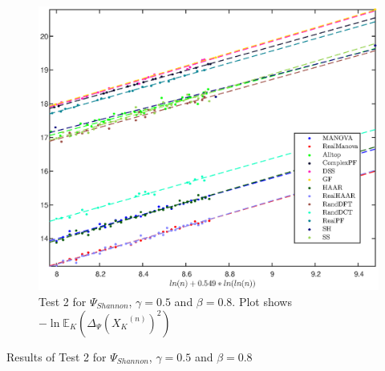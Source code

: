 \documentclass[a4paper,12pt]{article}
\newcommand{\TODO}[1]{ {\tt \color{red} [TODO:#1] } }
\newcommand{\E}{\ensuremath{\mathbb{E}}}
\newcommand{\specstat}{\ensuremath{\Psi}}
\newcommand{\Xk}{\ensuremath{X_K}}
\begin{document}
%

\begin{figure}[h]
\centering
\includegraphics[width=5in]{FuncShannonAll_Mse_gamma0_5_beta1_25_minN1000_pnas2.eps}
\caption{Test 2 for $\specstat_{Shannon}$, $\gamma=0.5$ and $\beta=0.8$. Plot shows $-\ln\E_{K}(\Delta_\specstat(\Xk^{(n)})^2)$
}
\label{fig:f_Shannon}
\end{figure}
\begin{table}[h]
\centering

\caption{Results of Test 2 for $\specstat_{Shannon}$, $\gamma=0.5$ and $\beta=0.8$}
\label{tab:f_Shannon}
\end{table}
\end{document}
